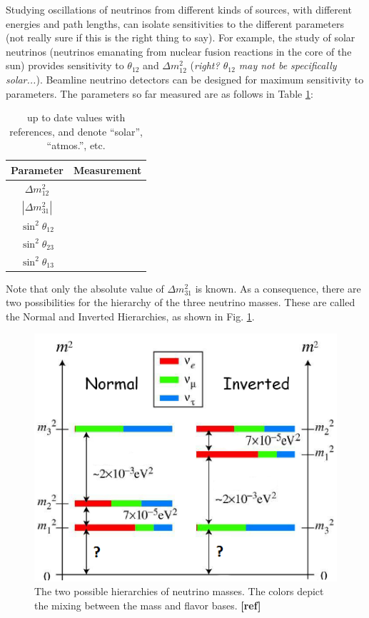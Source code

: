 Studying oscillations of neutrinos from different kinds of sources, with different energies and path lengths, can isolate sensitivities to the different parameters {\color{gray}(not really sure if this is the right thing to say)}.  For example, the study of solar neutrinos (neutrinos emanating from nuclear fusion reactions in the core of the sun) provides sensitivity to $\theta_{12}$ and $\Delta m_{12}^{2}$ {\color{gray}(\emph{right? $\theta_{12}$ may not be specifically solar...})}.  Beamline neutrino detectors can be designed for maximum sensitivity to parameters.  The parameters so far measured are as follows in Table  \ref{table:nu_osc_vals}:

\begin{table}[!htbp]
\caption{up to date values with references, and denote ``solar'', ``atmos.'', etc.} %
\label{table:nu_osc_vals}
\begin{tabular}{c|c}
Parameter & Measurement \\
\hline
$\Delta m_{12}^{2}$ & \\
$|\Delta m_{31}^{2}|$ & \\
$\sin^{2} \theta_{12}$ & \\
$\sin^{2} \theta_{23}$ & \\
$\sin^{2} \theta_{13}$ & \\
\end{tabular}
\end{table}

Note that only the absolute value of $\Delta m_{31}^{2}$ is known.  As a consequence, there are two possibilities for the hierarchy of the three neutrino masses.  These are called the Normal and Inverted Hierarchies, as shown in Fig. \ref{fig:numasshier}.

\begin{figure}[H]
        \centering
                \includegraphics[width=.5\textwidth]{figures/hierarchy_alterred.png}
                \caption{The two possible hierarchies of neutrino masses.  The colors depict the mixing between the mass and flavor bases. {\color{red}\textbf{[ref]}}}
\label{fig:numasshier}
\end{figure}

